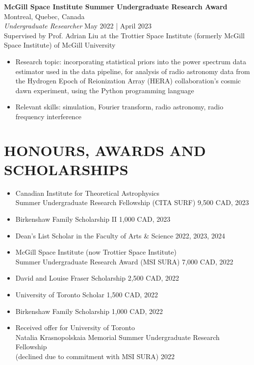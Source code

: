\documentclass[a4paper,10pt]{extarticle}
\begin{document}
 
\textbf{McGill Space Institute Summer Undergraduate Research Award} \hfill Montreal, Quebec, Canada\\
\textit{Undergraduate Researcher} \hfill May 2022 | April 2023\\
Supervised by Prof. Adrian Liu at the Trottier Space Institute (formerly McGill Space Institute) of McGill University
\begin{itemize}
    \item Research topic: incorporating statistical priors into the power spectrum data estimator used in the data pipeline, for analysis of radio astronomy data from the Hydrogen Epoch of Reionization Array (HERA) collaboration's cosmic dawn experiment, using the Python programming language

    \item Relevant skills: simulation, Fourier transform, radio astronomy, radio frequency interference
\end{itemize}


\newpage
\section*{HONOURS, AWARDS AND SCHOLARSHIPS}
\begin{itemize}
    \item Canadian Institute for Theoretical Astrophysics \\
    Summer Undergraduate Research Fellowship (CITA SURF) \hfill 9,500 CAD, 2023
    
    \item Birkenshaw Family Scholarship II \hfill 1,000 CAD, 2023

    \item Dean's List Scholar in the Faculty of Arts \& Science \hfill 2022, 2023, 2024

    \item McGill Space Institute (now Trottier Space Institute) \\Summer Undergraduate Research Award (MSI SURA) \hfill 7,000 CAD, 2022

    \item David and Louise Fraser Scholarship \hfill 2,500 CAD, 2022

    \item University of Toronto Scholar \hfill 1,500 CAD, 2022

    \item Birkenshaw Family Scholarship \hfill 1,000 CAD, 2022

    \item Received offer for University of Toronto \\Natalia Krasnopolskaia Memorial Summer Undergraduate Research Fellowship \\(declined due to commitment with MSI SURA) \hfill 2022
\end{itemize}
\end{document}
